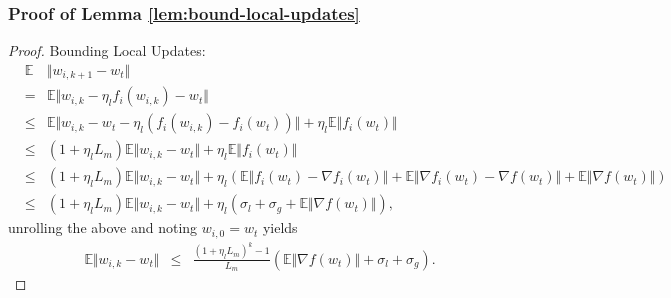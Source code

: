 \subsubsection{Proof of Lemma \ref{lem:bound-local-updates}}
\begin{proof}
    Bounding Local Updates:
    \begin{eqnarray}
        &\mathbb{E}&\Vert w_{i,k+1} - w_t \Vert \nonumber   \\
        &=& \mathbb{E} \Vert w_{i,k} - \eta_l f_i(w_{i,k}) - w_t \Vert   \nonumber   \\
        &\le& \mathbb{E}\Vert w_{i,k} - w_t - \eta_l (f_i(w_{i,k}) - f_i(w_t))  \Vert + \eta_l\mathbb{E}\Vert f_i(w_t) \Vert   \nonumber   \\
        &\le& (1 + \eta_l L_m )\mathbb{E}\Vert w_{i,k} - w_t \Vert + \eta_l\mathbb{E}\Vert f_i(w_t) \Vert    \nonumber   \\
        &\le& (1 + \eta_l L_m )\mathbb{E}\Vert w_{i,k} - w_t \Vert + \eta_l(\mathbb{E}\Vert f_i(w_t) - \nabla f_i(w_t) \Vert + \mathbb{E}\Vert \nabla f_i(w_t) -\nabla f(w_t) \Vert + \mathbb{E}\Vert \nabla f(w_t) \Vert)   \nonumber   \\
        &\le& (1 + \eta_l L_m )\mathbb{E}\Vert w_{i,k} - w_t \Vert + \eta_l( \sigma_{l} + \sigma_{g}+\mathbb{E}\Vert \nabla f(w_t) \Vert),    \nonumber
    \end{eqnarray}
    unrolling the above and noting $w_{i,0} = w_t$ yields
    \begin{eqnarray}
        \mathbb{E}\Vert w_{i,k} - w_t \Vert
        &\le& \frac{(1 + \eta_l L_m)^k-1}{L_m} \left( \mathbb{E}\Vert \nabla f(w_t) \Vert +\sigma_{l} + \sigma_{g} \right). \nonumber 
    \end{eqnarray}
\end{proof}

